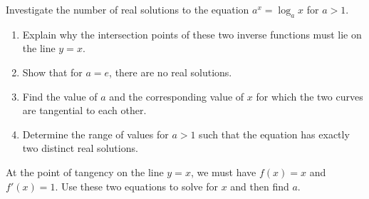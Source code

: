 \begin{problem}
Investigate the number of real solutions to the equation $a^x = \log_a x$ for $a > 1$.
\begin{enumerate}[label=(\roman*)]
\item Explain why the intersection points of these two inverse functions must lie on the line $y = x$.
\item Show that for $a = e$, there are no real solutions.
\item Find the value of $a$ and the corresponding value of $x$ for which the two curves are tangential to each other.
\item Determine the range of values for $a > 1$ such that the equation has exactly two distinct real solutions.
\end{enumerate}

\begin{center}
\end{center}
\end{problem}

\begin{hint}
At the point of tangency on the line $y=x$, we must have $f(x) = x$ and $f'(x) = 1$. Use these two equations to solve for $x$ and then find $a$.
\end{hint}

